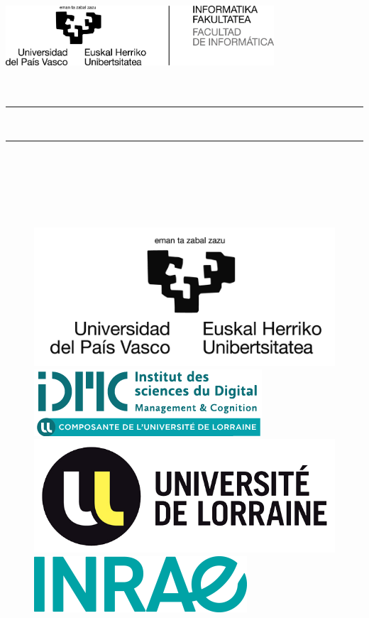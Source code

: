 \thispagestyle{empty}

\newcommand{\HRule}{\rule{\linewidth}{0.5mm}} 

\thispagestyle{empty}
\begin{center}
	
  \includegraphics[width=0.75\textwidth]{Control/UPV_control/UPV_utils/config/FacultadInformatica-Gipuzkoa-bilingue-positivo-alta.jpg} \\[2cm]
  
  {\LARGE {\malizenburua}\\[0.5cm]
  {\Large \ikasketak}}\\[2cm]
  
  
  \HRule \\[0.5cm]
  {\LARGE 
    \textbf{\izenburua}
  }
  \HRule \\[0.5cm]

  \Large \textsl{\egilea}\\
  
   
  \vfill
  
  \textbf{\zuzendariaktestua}\\  \zuzendariak \ \\[2cm]
  
  \data

\begin{figure}[htp]
\centering
\includegraphics[width=.20\textwidth]{Figures/00_Logos/logo_upv.jpg}\hfill
\includegraphics[width=.20\textwidth]{Figures/00_Logos/logo_idmc.png}\hfill
\includegraphics[width=.20\textwidth]{Figures/00_Logos/logo_lorraine.png}\hfill
\includegraphics[width=.20\textwidth]{Figures/00_Logos/logo_inrae.png}
\end{figure}

\end{center}
